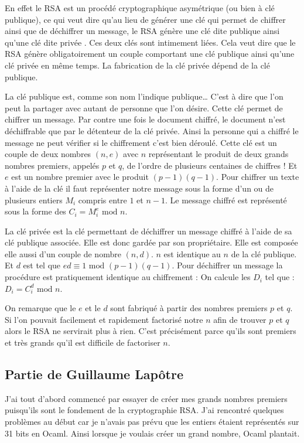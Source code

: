 \documentclass[a4paper,12pt]{article}
\begin{document}
En effet le RSA est un procédé cryptographique asymétrique (ou bien à clé publique), ce qui veut dire qu'au lieu de générer une clé qui permet de chiffrer ainsi que de déchiffrer un message, le RSA génère une clé dite \og publique \fg{} ainsi qu'une clé dite \og privée \fg{}. Ces deux clés sont intimement liées. Cela veut dire que le RSA génère obligatoirement un couple comportant une clé publique ainsi qu'une clé privée en même temps. La fabrication de la clé privée dépend de la clé publique.

La clé publique est, comme son nom l'indique publique\dots{} C'est à dire que l'on peut la partager avec autant de personne que l'on désire. Cette clé permet de chiffrer un message. Par contre une fois le document chiffré, le document n'est déchiffrable que par le détenteur de la clé privée. Ainsi la personne qui a chiffré le message ne peut vérifier si le chiffrement c'est bien déroulé. Cette clé est un couple de deux nombres $(n, e)$ avec $n$ représentant le produit de deux grands nombres premiers, appelés $p$ et $q$, de l'ordre de plusieurs centaines de chiffres ! Et $e$ est un nombre premier avec le produit $(p - 1)(q - 1)$. Pour chiffrer un texte à l'aide de la clé il faut représenter notre message sous la forme d'un ou de plusieurs entiers $M_{i}$ compris entre $1$ et $n - 1$. Le message chiffré est représenté sous la forme des $C_{i} = M_{i}^e \textrm{ mod } n$.

La clé privée est la clé permettant de déchiffrer un message chiffré à l'aide de sa clé publique associée. Elle est donc gardée par son propriétaire. Elle est composée elle aussi d'un couple de nombre $(n, d)$. $n$ est identique au $n$ de la clé publique. Et $d$ est tel que $ed \equiv 1 \textrm{ mod } (p - 1)(q - 1)$. Pour déchiffrer un message la procédure est pratiquement identique au chiffrement : On calcule les $D_{i}$ tel que : $D_{i} = C_{i}^d \textrm{ mod } n$.

On remarque que le $e$ et le $d$ sont fabriqué à partir des nombres premiers $p$ et $q$. Si l'on pouvait facilement et rapidement factorisé notre $n$ afin de trouver $p$ et $q$ alors le RSA ne servirait plus à rien. C'est précisément parce qu'ils sont premiers et très grands qu'il est difficile de factoriser $n$.

\subsection{Partie de Guillaume Lap\^{o}tre}

J'ai tout d'abord commencé par essayer de créer mes grands nombres premiers puisqu'ils sont le fondement de la cryptographie RSA. J'ai rencontré quelques problèmes au début car je n'avais pas prévu que les entiers étaient représentés sur 31 bits en Ocaml. Ainsi lorsque je voulais créer un grand nombre, Ocaml plantait.
\end{document}
